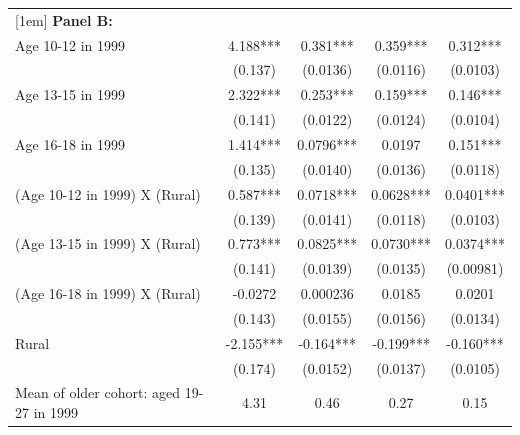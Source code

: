\documentclass[12pt,letterpaper]{article}
\newcommand{\0}{\ensuremath{\mbox{\boldmath $0$}}}
\begin{document}
\begin{table}[h!]
\begin{center}
{{\begin{tabular}{lcccc}
	[1em]
	{\textbf{Panel B:}}                         &                   &                       &                   &                   \\
	Age 10-12 in 1999                            &       4.188***&       0.381***&       0.359***&       0.312***\\
	                                            &     (0.137)         &    (0.0136)         &    (0.0116)         &    (0.0103)         \\
	[1em]
	Age 13-15 in 1999                            &       2.322***&       0.253***&       0.159***&       0.146***\\
	                                            &     (0.141)         &    (0.0122)         &    (0.0124)         &    (0.0104)         \\
	[1em]
	Age 16-18 in 1999                           &       1.414***&      0.0796***&      0.0197         &       0.151***\\
	                                            &     (0.135)         &    (0.0140)         &    (0.0136)         &    (0.0118)         \\
	[1em]
	(Age 10-12 in 1999) X (Rural)               &     0.587***&      0.0718***&      0.0628***&      0.0401***\\
	                                            &     (0.139)         &    (0.0141)         &    (0.0118)         &    (0.0103)         \\
	[1em]
	(Age 13-15 in 1999) X (Rural)              &       0.773***&      0.0825***&      0.0730***&      0.0374***\\
	                                            &     (0.141)         &    (0.0139)         &    (0.0135)         &   (0.00981)         \\
	[1em]
	(Age 16-18 in 1999) X (Rural)               &     -0.0272         &    0.000236         &      0.0185         &      0.0201         \\
	                                             &     (0.143)         &    (0.0155)         &    (0.0156)         &    (0.0134)         \\
	[1em]
	Rural                                      &      -2.155***&      -0.164***&      -0.199***&      -0.160***\\
	                                           &     (0.174)         &    (0.0152)         &    (0.0137)         &    (0.0105)         \\
	\hline
	Mean of older cohort: aged 19-27 in 1999                  &   4.31            &      0.46     &       0.27        &  0.15                         \\

\end{tabular}}}
\end{center}
\end{table}
\end{document}
